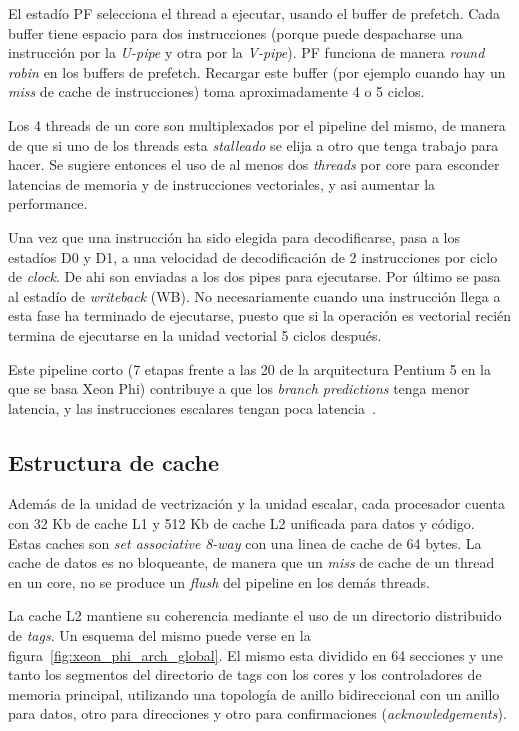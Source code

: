 El estad\'io PF selecciona el thread a ejecutar, usando el buffer de prefetch. Cada buffer tiene espacio para dos
instrucciones (porque puede despacharse una instrucci\'on por la \textit{U-pipe} y otra por la \textit{V-pipe}). PF
funciona de manera \textit{round robin} en los buffers de prefetch. Recargar este buffer (por ejemplo cuando hay un
\textit{miss} de cache de instrucciones) toma aproximadamente 4 o 5 ciclos.

Los 4 threads de un core son multiplexados por el pipeline del mismo, de manera de que si uno de los threads esta
\textit{stalleado} se elija a otro que tenga trabajo para hacer. Se sugiere entonces el uso de al menos dos 
\textit{threads} por core para esconder latencias de memoria y de instrucciones vectoriales, y asi aumentar la performance.

Una vez que una instrucci\'on ha sido elegida para decodificarse, pasa a los estad\'ios D0 y D1, a una velocidad de
decodificaci\'on de 2 instrucciones por ciclo de \textit{clock}. De ahi son enviadas a los dos pipes para ejecutarse.
Por \'ultimo se pasa al estad\'io de \textit{writeback} (WB). No necesariamente cuando una instrucci\'on llega a esta
fase ha terminado de ejecutarse, puesto que si la operaci\'on es vectorial reci\'en termina de ejecutarse en la unidad
vectorial 5 ciclos despu\'es.

Este pipeline corto (7 etapas frente a las 20 de la arquitectura Pentium 5 en la que se basa Xeon Phi) contribuye a que
los \textit{branch predictions} tenga menor latencia, y las instrucciones escalares tengan poca latencia~\cite{IntelXeonPhiWhitePaper}.

\subsection{Estructura de cache}

Adem\'as de la unidad de vectrizaci\'on y la unidad escalar, cada procesador cuenta con 32 Kb de cache L1 y 512 Kb de cache
L2 unificada para datos y c\'odigo. Estas caches son \textit{set associative} \textit{8-way} con una linea de cache de 64 bytes. 
La cache de datos es no bloqueante, de manera que un \textit{miss} de cache de un thread en un core, 
no se produce un \textit{flush} del pipeline en los dem\'as threads.

La cache L2 mantiene su coherencia mediante el uso de un directorio distribuido de \textit{tags}. Un esquema del mismo puede
verse en la figura~\ref{fig:xeon_phi_arch_global}. El mismo esta dividido en 64 secciones y une tanto los segmentos del
directorio de tags con los cores y los controladores de memoria principal, utilizando una topolog\'ia de anillo bidireccional
con un anillo para datos, otro para direcciones y otro para confirmaciones (\textit{acknowledgements}).

